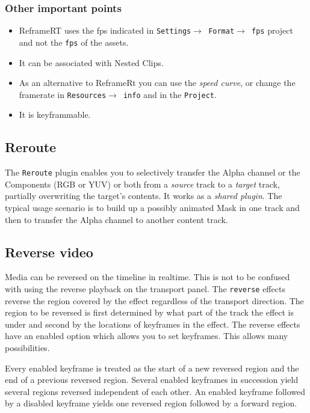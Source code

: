 \subsubsection*{Other important points}%
\label{ssub:other_important_points}

\begin{itemize}
    \item ReframeRT uses the fps indicated in \texttt{Settings$\rightarrow$ Format$\rightarrow$ fps} project and not the \texttt{fps} of the assets.
    \item It can be associated with Nested Clips.
    \item As an alternative to ReframeRt you can use the \textit{speed curve}, or change the framerate in \texttt{Resources$\rightarrow$ info} and in the \texttt{Project}.
    \item It is keyframmable.
\end{itemize}

\subsection{Reroute}%
\label{sub:reroute}

The \texttt{Reroute} plugin enables you to selectively transfer the Alpha channel or the Components (RGB or YUV) or both from a \textit{source} track to a \textit{target} track, partially overwriting the target's contents. It works as a \textit{shared plugin}. The typical usage scenario is to build up a possibly animated Mask in one track and then to transfer the Alpha channel to another content track.

\subsection{Reverse video}%
\label{sub:reverse_video}

Media can be reversed on the timeline in realtime. This is not to be confused with using the reverse playback on the transport panel. The \texttt{reverse} effects reverse the region covered by the effect regardless of the transport direction. The region to be reversed is first determined by what part of the track the effect is under and second by the locations of keyframes in the effect. The reverse effects have an enabled option which allows you to set keyframes. This allows many possibilities.

Every enabled keyframe is treated as the start of a new reversed region and the end of a previous reversed region. Several enabled keyframes in succession yield several regions reversed independent of each other. An enabled keyframe followed by a disabled keyframe yields one reversed region followed by a forward region.

